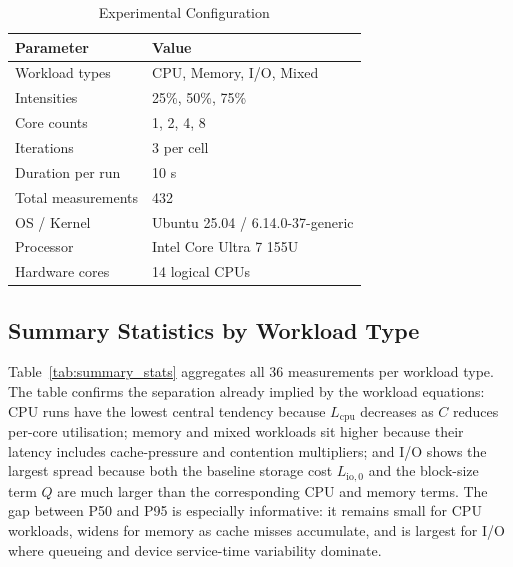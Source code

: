 \documentclass[conference]{IEEEtran}
\begin{document}
\begin{table}[htbp]
\caption{Experimental Configuration}
\label{tab:setup}
\begin{center}
\begin{tabular}{ll}
\toprule
\textbf{Parameter} & \textbf{Value} \\
\midrule
Workload types     & CPU, Memory, I/O, Mixed \\
Intensities        & 25\%, 50\%, 75\% \\
Core counts        & 1, 2, 4, 8 \\
Iterations         & 3 per cell \\
Duration per run   & 10 s \\
Total measurements & 432 \\
OS / Kernel        & Ubuntu 25.04 / 6.14.0-37-generic \\
Processor          & Intel Core Ultra 7 155U \\
Hardware cores     & 14 logical CPUs \\
\bottomrule
\end{tabular}
\end{center}
\end{table}

\subsection{Summary Statistics by Workload Type}
\label{subsec:summary_stats}

Table~\ref{tab:summary_stats} aggregates all 36 measurements per workload type.
The table confirms the separation already implied by the workload equations:
CPU runs have the lowest central tendency because $L_{\text{cpu}}$ decreases as
$C$ reduces per-core utilisation; memory and mixed workloads sit higher because
their latency includes cache-pressure and contention multipliers; and I/O shows
the largest spread because both the baseline storage cost $L_{\text{io},0}$ and
the block-size term $Q$ are much larger than the corresponding CPU and memory
terms.  The gap between P50 and P95 is especially informative: it remains small
for CPU workloads, widens for memory as cache misses accumulate, and is largest
for I/O where queueing and device service-time variability dominate.
\end{document}
